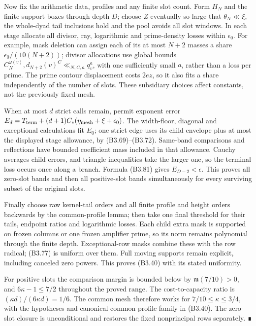 \documentclass[11pt,a4paper]{article}
\begin{document}
Now fix the arithmetic data, profiles and any finite slot count. Form
\(H_N\) and the finite support boxes through depth \(D\); choose \(Z\)
eventually so large that \(\theta_N\ll\xi\), the whole-dyad tail
inclusions hold and the pool avoids all slot windows. In each stage
allocate all divisor, ray, logarithmic and prime-density losses within
\(\epsilon_0\). For example, mask deletion can assign each of its at
most \(N+2\) masses a share \(\epsilon_0/(10(N+2))\); divisor
allocations use global bounds
\(C_N^{\omega(v)},\allowbreak{}d_{N+2}(v)^C\ll_{N,\allowbreak{}C,\allowbreak{}a}q_v^a\), with one sufficiently
small \(a\), rather than a loss per prime. The prime contour
displacement costs \(2ez\), so it also fits a share independently of the
number of slots. These subsidiary choices affect constants, not the
previously fixed mesh.

When at most \(d\) strict calls remain, permit exponent error
\(E_d=T_{\rm term}+(d+1)C_*(\eta_{\rm mesh}+\xi+\epsilon_0)\). The
width-floor, diagonal and exceptional calculations fit \(E_0\); one
strict edge uses its child envelope plus at most the displayed stage
allowance, by (B3.69)--(B3.72). Same-band comparisons and reflections
have bounded coefficient mass included in that allowance. Cauchy
averages child errors, and triangle inequalities take the larger one, so
the terminal loss occurs once along a branch. Formula (B3.81) gives
\(E_{D-2}<\epsilon\). This proves all zero-slot bands and then all
positive-slot bands simultaneously for every surviving subset of the
original slots.

Finally choose raw kernel-tail orders and all finite profile and height
orders backwards by the common-profile lemma; then take one final
threshold for their tails, endpoint ratios and logarithmic losses. Each
child extra mask is supported on frozen columns or one frozen amplifier
prime, so its norm remains polynomial through the finite depth.
Exceptional-row masks combine these with the row radical; (B3.77) is
uniform over them. Full moving supports remain explicit, including
canceled zero powers. This proves (B3.40) with its stated uniformity.

For positive slots the comparison margin is bounded below by
\(\mathfrak m(7/10)>0\), and \(6\kappa-1\le7/2\) throughout the proved
range. The cost-to-capacity ratio is \((\kappa d)/(6\kappa d)=1/6\). The
common mesh therefore works for \(7/10\le\kappa\le3/4\), with the
hypotheses and canonical common-profile family in (B3.40). The zero-slot
closure is unconditional and restores the fixed nonprincipal rows
separately. ∎
\end{document}
